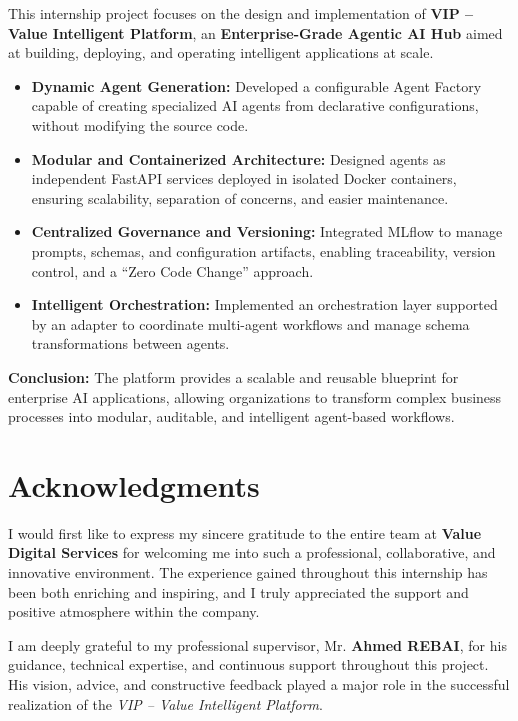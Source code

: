 This internship project focuses on the design and implementation of \textbf{VIP -- Value Intelligent Platform}, an \textbf{Enterprise-Grade Agentic AI Hub} aimed at building, deploying, and operating intelligent applications at scale.

\begin{itemize}
    \item \textbf{Dynamic Agent Generation:} Developed a configurable Agent Factory capable of creating specialized AI agents from declarative configurations, without modifying the source code.
    
    \item \textbf{Modular and Containerized Architecture:} Designed agents as independent FastAPI services deployed in isolated Docker containers, ensuring scalability, separation of concerns, and easier maintenance.
    
    \item \textbf{Centralized Governance and Versioning:} Integrated MLflow to manage prompts, schemas, and configuration artifacts, enabling traceability, version control, and a ``Zero Code Change'' approach.
    
    \item \textbf{Intelligent Orchestration:} Implemented an orchestration layer supported by an adapter to coordinate multi-agent workflows and manage schema transformations between agents.
\end{itemize}

\textbf{Conclusion:} The platform provides a scalable and reusable blueprint for enterprise AI applications, allowing organizations to transform complex business processes into modular, auditable, and intelligent agent-based workflows.

\newpage
\section*{Acknowledgments}

I would first like to express my sincere gratitude to the entire team at \textbf{Value Digital Services} for welcoming me into such a professional, collaborative, and innovative environment. The experience gained throughout this internship has been both enriching and inspiring, and I truly appreciated the support and positive atmosphere within the company.
\vspace{1em}

I am deeply grateful to my professional supervisor, Mr. \textbf{Ahmed REBAI}, for his guidance, technical expertise, and continuous support throughout this project. His vision, advice, and constructive feedback played a major role in the successful realization of the \textit{VIP -- Value Intelligent Platform}.
\vspace{1em}

